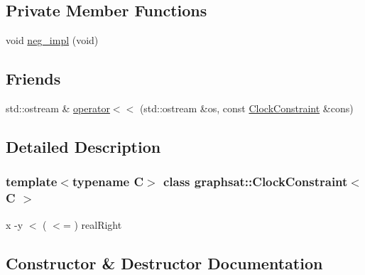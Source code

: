 \subsection*{Private Member Functions}
\begin{DoxyCompactItemize}
\item 
void \mbox{\hyperlink{classgraphsat_1_1_clock_constraint_a5217585f904187d8cf0880e6dd1838b0}{neg\+\_\+impl}} (void)
\end{DoxyCompactItemize}
\subsection*{Friends}
\begin{DoxyCompactItemize}
\item 
std\+::ostream \& \mbox{\hyperlink{classgraphsat_1_1_clock_constraint_a8c772e8d9664dae2d72c5279736e6052}{operator$<$$<$}} (std\+::ostream \&os, const \mbox{\hyperlink{classgraphsat_1_1_clock_constraint}{Clock\+Constraint}} \&cons)
\end{DoxyCompactItemize}


\subsection{Detailed Description}
\subsubsection*{template$<$typename C$>$\newline
class graphsat\+::\+Clock\+Constraint$<$ C $>$}

x -\/y $<$ ( $<$= ) real\+Right 

\subsection{Constructor \& Destructor Documentation}
\mbox{\label{classgraphsat_1_1_clock_constraint_acb93892181e50c6bbbe2a67faaf27242}} 
